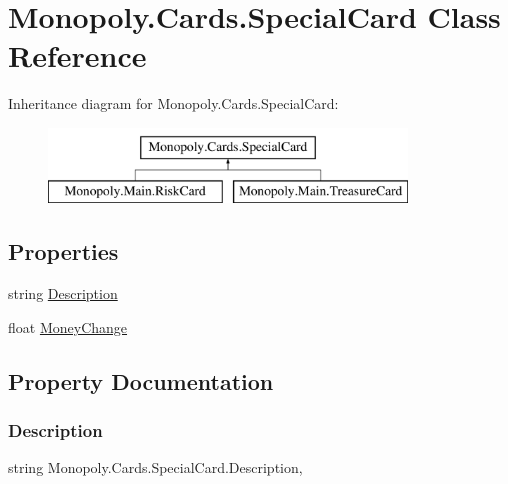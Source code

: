 \hypertarget{class_monopoly_1_1_cards_1_1_special_card}{}\section{Monopoly.\+Cards.\+Special\+Card Class Reference}
\label{class_monopoly_1_1_cards_1_1_special_card}
Inheritance diagram for Monopoly.\+Cards.\+Special\+Card\+:\begin{figure}[H]
\begin{center}
\leavevmode
\includegraphics[height=2.000000cm]{class_monopoly_1_1_cards_1_1_special_card}
\end{center}
\end{figure}
\subsection*{Properties}
\begin{DoxyCompactItemize}
\item 
string \mbox{\hyperlink{class_monopoly_1_1_cards_1_1_special_card_a7404d6bf23aa3858a8831075162bcb66}{Description}}
\item 
float \mbox{\hyperlink{class_monopoly_1_1_cards_1_1_special_card_ab81aa9650e34745aa35b313730a8c0c4}{Money\+Change}}
\end{DoxyCompactItemize}


\subsection{Property Documentation}
\mbox{\label{class_monopoly_1_1_cards_1_1_special_card_a7404d6bf23aa3858a8831075162bcb66}} 
\subsubsection{\texorpdfstring{Description}{Description}}
{\footnotesize\ttfamily string Monopoly.\+Cards.\+Special\+Card.\+Description\hspace{0.3cm}{\ttfamily [get]}, {}}

